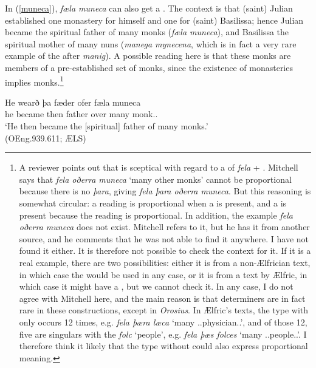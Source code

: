 \documentclass[output=paper,colorlinks,citecolor=brown]{langscibook}
\begin{document}
In (\ref{muneca}), \textit{fæla muneca} can also get a . The context is that (saint) Julian established one monastery for himself and one for (saint) Basilissa; hence Julian became the spiritual father of many monks (\textit{fæla muneca}), and Basilissa the spiritual mother of many nuns (\textit{manega mynecena}, which is in fact a very rare example of the  after \textit{manig}). A possible reading here is that these monks are members of a pre-established set of monks, since the existence of monasteries implies monks.\footnote{A reviewer points out that \citet[vol. I, 172--173]{Mitchell85} is sceptical with regard to a  of \textit{fela} + . Mitchell says that \textit{fela oðerra muneca} ‘many other monks’ cannot be proportional because there is no  \textit{þara}, giving \textit{fela þara oðerra muneca}. But this reasoning is somewhat circular: a reading is proportional when a  is present, and a  is present because the reading is proportional. In addition, the example \textit{fela oðerra muneca} does not exist. Mitchell refers to it, but he has it from another source, and he comments that he was not able to find it anywhere. I have not found it either. It is therefore not possible to check the context for it. If it is a real example, there are two possibilities: either it is from a non-Ælfrician text, in which case the  would be used in any case, or it is from a text by Ælfric, in which case it might have a , but we cannot check it. In any case, I do not agree with Mitchell here, and the main reason is that  determiners are in fact rare in these constructions, except in\textit{ Orosius}. In Ælfric’s texts, the type with  only occurs 12 times, e.g. \textit{fela þæra læca} ‘many \DEF.\GEN.\PL physician.\GEN.\PL', and of those 12, five are singulars with the  \textit{folc} ‘people’, e.g. \textit{fela þæs folces} ‘many \DEF.\GEN.\SG people.\GEN.\SG'. I therefore think it likely that the type without  could also express proportional meaning. }

\ea\label{muneca}
\gll He wearð þa fæder ofer fæla muneca\\
he became then father over many monk.\GEN.\PL{}\\
\glt ‘He then became the [spiritual] father of many monks.’ \\(OEng.939.611; ÆLS)
\z
\end{document}
